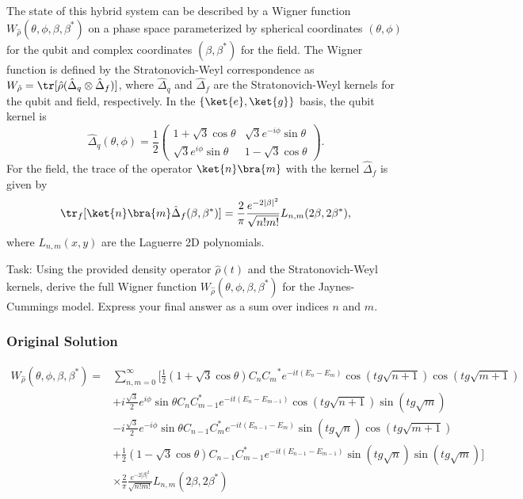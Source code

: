 \documentclass[10pt]{article}
\begin{document}
The state of this hybrid system can be described by a Wigner function $W_{\hat{\rho}}(\theta, \phi, \beta, \beta^*)$ on a phase space parameterized by spherical coordinates $(\theta, \phi)$ for the qubit and complex coordinates $(\beta, \beta^*)$ for the field. The Wigner function is defined by the Stratonovich-Weyl correspondence as $W_{\hat{\rho}} = \tr[\hat{\rho} (\hat{\Delta}_q \otimes \hat{\Delta}_f)]$, where $\hat{\Delta}_q$ and $\hat{\Delta}_f$ are the Stratonovich-Weyl kernels for the qubit and field, respectively. In the $\{\ket{e}, \ket{g}\}$ basis, the qubit kernel is
$$
\hat{\Delta}_q(\theta,\phi) = \frac{1}{2}\left(
\begin{array}{cc}
	1+\sqrt{3}\cos{\theta} & \sqrt{3}e^{-i\phi}\sin{\theta} \\
	\sqrt{3}e^{i\phi}\sin{\theta} & 1-\sqrt{3}\cos{\theta} 
\end{array}
\right).
$$
For the field, the trace of the operator $\ket{n}\bra{m}$ with the kernel $\hat{\Delta}_f$ is given by
$$
\tr_f[\ket{n}\bra{m} \hat{\Delta}_f(\beta, \beta^*)] = \frac{2}{\pi}\frac{e^{-2|\beta|^{2}}}{\sqrt{n!m!}}L_{n,m}(2\beta,2\beta^{*}),
$$
where $L_{n,m}(x, y)$ are the Laguerre 2D polynomials.

Task:
Using the provided density operator $\hat{\rho}(t)$ and the Stratonovich-Weyl kernels, derive the full Wigner function $W_{\hat{\rho}}(\theta, \phi, \beta, \beta^*)$ for the Jaynes-Cummings model. Express your final answer as a sum over indices $n$ and $m$.

\subsubsection*{Original Solution}
\[ \begin{aligned}
W_{\hat{\rho}}(\theta, \phi, \beta,\beta^{*}) = & \sum_{n,m=0}^{\infty}\Big[\frac{1}{2}(1+\sqrt{3}\cos\theta) C_n{C_m}^{*} {e^{-it(E_n-E_m)}}\cos(tg\sqrt{n+1})\cos(tg\sqrt{m+1}) \\
& +i\frac{\sqrt{3}}{2}e^{i\phi}\sin\theta C_n C_{m-1}^{*}{e^{-it(E_n-E_{m-1})}}\cos(tg\sqrt{n+1})\sin(tg\sqrt{m}) \\
& -i\frac{\sqrt{3}}{2}e^{-i\phi}\sin\theta C_{n-1}C_m^{*} {e^{-it(E_{n-1}-E_m)}}\sin(tg\sqrt{n})\cos(tg\sqrt{m+1}) \\
& +\frac{1}{2}(1-\sqrt{3}\cos\theta) C_{n-1}C_{m-1}^{*} {e^{-it(E_{n-1}-E_{m-1})}}\sin(tg\sqrt{n})\sin(tg\sqrt{m})\Big] \\
& \times \frac{2}{\pi}\frac{e^{-2|\beta|^{2}}}{\sqrt{n!m!}}L_{n,m}(2\beta,2\beta^{*})
\end{aligned} \]
\end{document}

